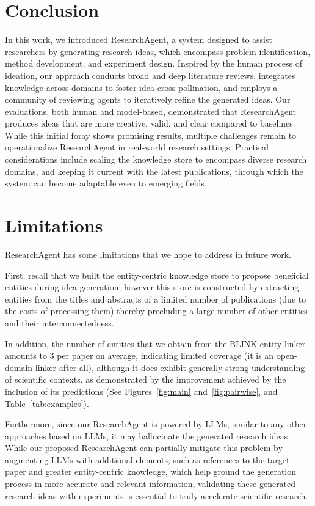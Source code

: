 \section{Conclusion}
In this work, we introduced ResearchAgent, a system designed to assist researchers by generating research ideas, which encompass problem identification, method development, and experiment design. Inspired by the human process of ideation, our approach conducts broad and deep literature reviews, integrates knowledge across domains to foster idea cross-pollination, and employs a community of reviewing agents to iteratively refine the generated ideas. Our evaluations, both human and model-based, demonstrated that ResearchAgent produces ideas that are more creative, valid, and clear compared to baselines. While this initial foray shows promising results, multiple challenges remain to operationalize ResearchAgent in real-world research settings. Practical considerations include scaling the knowledge store to encompass diverse research domains, and keeping it current with the latest publications, through which the system can become adaptable even to emerging fields.


\section*{Limitations}
ResearchAgent has some limitations that we hope to address in future work.

First, recall that we built the entity-centric knowledge store to propose beneficial entities during idea generation; however this store is constructed by extracting entities from the titles and abstracts of a limited number of publications (due to the costs of processing them) thereby precluding a large number of other entities and their interconnectedness. 

In addition, the number of entities that we obtain from the BLINK entity linker~\cite{blink} amounts to 3 per paper on average, indicating limited coverage (it is an open-domain linker after all), although it does exhibit generally strong understanding of scientific contexts, as demonstrated by the improvement achieved by the inclusion of its predictions (See Figures~\ref{fig:main} and~\ref{fig:pairwise}, and Table~\ref{tab:examples}). 

Furthermore, since our ResearchAgent is powered by LLMs, similar to any other approaches based on LLMs, it may hallucinate the generated research ideas. While our proposed ResearchAgent can partially mitigate this problem by augmenting LLMs with additional elements, such as references to the target paper and greater entity-centric knowledge, which help ground the generation process in more accurate and relevant information, validating these generated research ideas with experiments is essential to truly accelerate scientific research.

